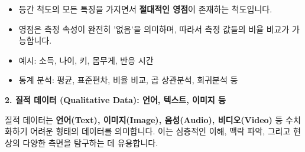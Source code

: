 \documentclass[
  letterpaper,
]{book}
\providecommand{\tightlist}{%
  \setlength{\itemsep}{0pt}\setlength{\parskip}{0pt}}
\begin{document}
\begin{itemize}
\begin{itemize}
    \begin{itemize}
    \tightlist
    \item
      등간 척도의 모든 특징을 가지면서 \textbf{절대적인 영점}이 존재하는
      척도입니다.
    \item
      영점은 측정 속성이 완전히 '없음'을 의미하며, 따라서 측정 값들의
      비율 비교가 가능합니다.
    \item
      예시: 소득, 나이, 키, 몸무게, 반응 시간
    \item
      통계 분석: 평균, 표준편차, 비율 비교, 곱 상관분석, 회귀분석 등
    \end{itemize}
  \end{itemize}
\end{itemize}

\textbf{2. 질적 데이터 (Qualitative Data): 언어, 텍스트, 이미지 등}

질적 데이터는 \textbf{언어(Text), 이미지(Image), 음성(Audio),
비디오(Video)} 등 수치화하기 어려운 형태의 데이터를 의미합니다. 이는
심층적인 이해, 맥락 파악, 그리고 현상의 다양한 측면을 탐구하는 데
유용합니다.
\end{document}
